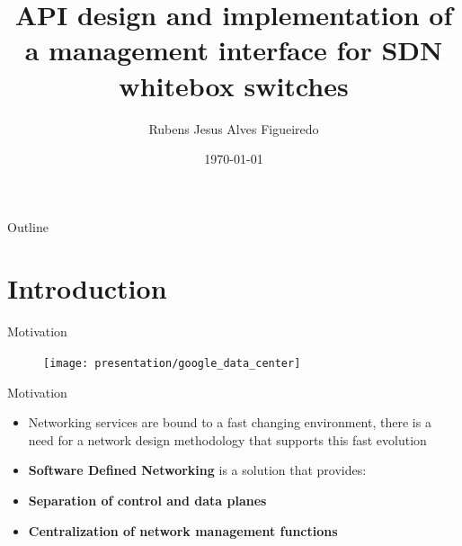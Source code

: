 \documentclass[aspectratio=43]{beamer}
\title[Management Interface]{API design and implementation of a management interface for SDN whitebox switches }
\author[Rubens]{Rubens Jesus Alves Figueiredo}
\institute{FEUP}
\date{\today}
\begin{document}
\begin{frame}
  \titlepage
        \texttt{[image: \{uporto-feup]}}
        \texttt{[image: \{bisdn-logo]}}
\end{frame}

\begin{frame}{Outline}
  \tableofcontents
\end{frame}

\section{Introduction}

\begin{frame}{Motivation}

  \begin{figure}
      \centering
      \texttt{[image: presentation/google\_data\_center]}
  \end{figure}



\end{frame}

\begin{frame}{Motivation}
	\begin{itemize}
        \item Networking services are bound to a fast changing environment, there is a need for a network design methodology that supports this
            fast evolution

        \item \textbf{Software Defined Networking} is a solution that provides:

        \item \textbf{Separation of control and data planes} 

        \item \textbf{Centralization of network management functions}
	\end{itemize}
\end{frame}
\end{document}
